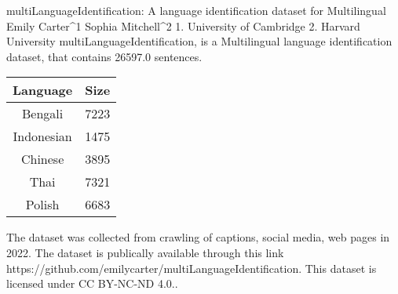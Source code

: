 
multiLanguageIdentification: A language identification dataset for Multilingual
Emily Carter^1 Sophia Mitchell^2
1. University of Cambridge 2. Harvard University
multiLanguageIdentification, is a Multilingual language identification dataset, that contains 26597.0 sentences.

    \begin{table}[h]
    \centering
    \begin{tabular}{|c|c|}
    \hline
    Language & Size \\
    \hline
    Bengali & 7223 \\ 
Indonesian & 1475 \\ 
Chinese & 3895 \\ 
Thai & 7321 \\ 
Polish & 6683 \\ 
 \hline
    \end{tabular}
    \end{table}
    
The dataset was collected from crawling of captions, social media, web pages in 2022. 
The dataset is publically available through this link https://github.com/emilycarter/multiLanguageIdentification. This dataset is licensed under CC BY-NC-ND 4.0..

